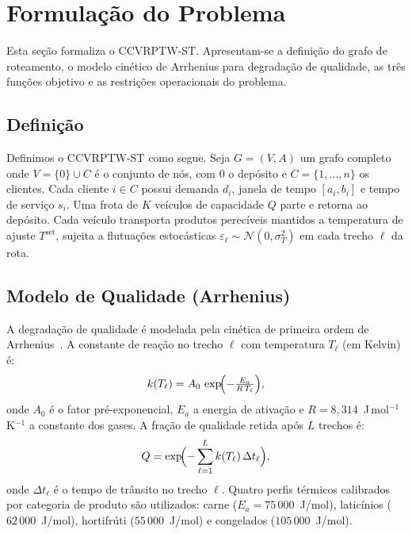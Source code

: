 \documentclass[a4paper,11pt]{article}
\begin{document}
\section{Formulação do Problema}

Esta seção formaliza o CCVRPTW-ST. Apresentam-se a definição do grafo de roteamento, o modelo cinético de Arrhenius para degradação de qualidade, as três funções objetivo e as restrições operacionais do problema.

\subsection{Definição}

Definimos o CCVRPTW-ST como segue.
Seja $G = (V, A)$ um grafo completo onde $V = \{0\} \cup C$ é o conjunto de
nós, com $0$ o depósito e $C = \{1,\ldots,n\}$ os clientes.
Cada cliente $i \in C$ possui demanda $d_i$, janela de tempo $[a_i, b_i]$
e tempo de serviço $s_i$.
Uma frota de $K$ veículos de capacidade $Q$ parte e retorna ao depósito.
Cada veículo transporta produtos perecíveis mantidos a temperatura de ajuste
$T^{\mathrm{set}}$, sujeita a flutuações estocásticas $\varepsilon_\ell \sim
\mathcal{N}(0, \sigma_T^2)$ em cada trecho $\ell$ da rota.

\subsection{Modelo de Qualidade (Arrhenius)}

A degradação de qualidade é modelada pela cinética de primeira ordem de
Arrhenius~\citep{taoukis:1997,labuza:1982}. A constante de reação no trecho $\ell$
com temperatura $T_\ell$ (em Kelvin) é:
%
\begin{equation}
  k(T_\ell) = A_0 \,\exp\!\Bigl(-\tfrac{E_a}{R \, T_\ell}\Bigr),
  \label{eq:arrhenius}
\end{equation}
%
onde $A_0$ é o fator pré-exponencial, $E_a$ a energia de ativação e
$R = 8{,}314$~J\,mol$^{-1}$K$^{-1}$ a constante dos gases.
A fração de qualidade retida após $L$ trechos é:
%
\begin{equation}
  Q = \exp\!\Bigl(-\sum_{\ell=1}^{L} k(T_\ell)\,\Delta t_\ell\Bigr),
  \label{eq:quality}
\end{equation}
%
onde $\Delta t_\ell$ é o tempo de tr\^ansito no trecho $\ell$.
Quatro perfis térmicos calibrados por categoria de produto são utilizados:
carne ($E_a = 75\,000$~J/mol), laticínios ($62\,000$~J/mol), hortifrúti
($55\,000$~J/mol) e congelados ($105\,000$~J/mol).
\end{document}
